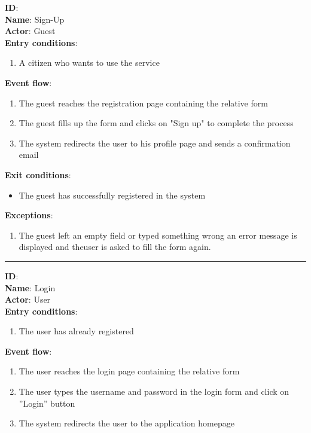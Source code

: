 	\textbf{ID}:  \\
	\textbf{Name}: Sign-Up \\
	\textbf{Actor}: Guest \\
	\textbf{Entry conditions}:
	\begin{enumerate}
		\item{A citizen who wants to use the service}
	\end{enumerate}
	\textbf{Event flow}:
	\begin{enumerate}
		\item{The guest reaches the registration page containing the relative form}
		\item{The guest ﬁlls up the form and clicks on "Sign up" to complete the process}
		\item{The system redirects the user to his proﬁle page and sends a conﬁrmation email}
	\end{enumerate}
	\textbf{Exit conditions}:
	\begin{itemize}
		\item{The guest has successfully registered in the system}
	\end{itemize}
	\textbf{Exceptions}:
	\begin{enumerate}
    		\item{The guest left an empty ﬁeld or typed something wrong an error message is displayed and theuser is asked to ﬁll the form again.}
 	   \end{enumerate}
	\rule{\linewidth}{0.4pt}
	\textbf{ID}:  \\
	\textbf{Name}: Login \\
	\textbf{Actor}: User \\
	\textbf{Entry conditions}:
	\begin{enumerate}
		\item{The user has already registered}
	\end{enumerate}
	\textbf{Event flow}:
	\begin{enumerate}
		\item{The user reaches the login page containing the relative form}
		\item{The user types the username and password in the login form and click on ”Login” button}
		\item{The system redirects the user to the application homepage}
	\end{enumerate}
